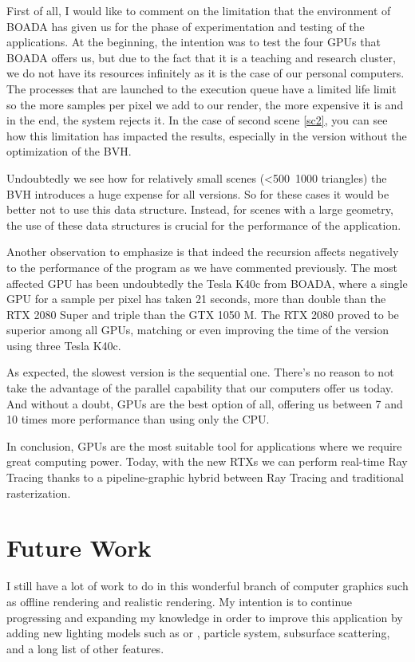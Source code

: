 \documentclass[titlepage,12pt]{report}
\begin{document}
First of all, I would like to comment on the limitation that the environment of BOADA has given us for the phase of experimentation and testing of the applications. At the beginning, the intention was to test the four GPUs that BOADA offers us, but due to the fact that it is a teaching and research cluster, we do not have its resources infinitely as it is the case of our personal computers. The processes that are launched to the execution queue have a limited life limit so the more samples per pixel we add to our render, the more expensive it is and in the end, the system rejects it. In the case of second scene \ref{sc2}, you can see how this limitation has impacted the results, especially in the version without the optimization of the BVH.

Undoubtedly we see how for relatively small scenes (<500~1000 triangles) the BVH introduces a huge expense for all versions. So for these cases it would be better not to use this data structure. Instead, for scenes with a large geometry, the use of these data structures is crucial for the performance of the application.

Another observation to emphasize is that indeed the recursion affects negatively to the performance of the program as we have commented previously. The most affected GPU has been undoubtedly the Tesla K40c from BOADA, where a single GPU for a sample per pixel has taken 21 seconds, more than double than the RTX 2080 Super and triple than the GTX 1050 M. The RTX 2080 proved to be superior among all GPUs, matching or even improving the time of the version using three Tesla K40c.

As expected, the slowest version is the sequential one. There's no reason to not take the advantage of the parallel capability that our computers offer us today.  And without a doubt, GPUs are the best option of all, offering us between 7 and 10 times more performance than using only the CPU.

In conclusion, GPUs are the most suitable tool for applications where we require great computing power. Today, with the new RTXs we can perform real-time Ray Tracing thanks to a pipeline-graphic hybrid between Ray Tracing and traditional rasterization.

\section{Future Work}

I still have a lot of work to do in this wonderful branch of computer graphics such as offline rendering and realistic rendering. My intention is to continue progressing and expanding my knowledge in order to improve this application by adding new lighting models such as \citep[pp.~25--32]{Ashikhmin2000} or \citep[pp.~239--246]{Oren1994}, particle system, subsurface scattering, and a long list of other features. 
\end{document}
